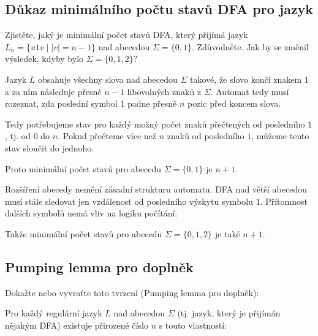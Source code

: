 
\subsection{Důkaz minimálního počtu stavů DFA pro jazyk}
Zjistěte, jaký je minimální počet stavů DFA, který přijímá jazyk $L_n = \{u1v \mid |v|=n-1\}$ nad abecedou
$\Sigma = \{0,1\}$. Zdůvodněte. Jak by se změnil výsledek, kdyby bylo $\Sigma = \{0,1,2\}$?
\newline

Jazyk $L$ obsahuje všechny slova nad abecedou $\Sigma$ takové, že slovo končí znakem $1$ a za ním následuje přesně $n-1$
libovolných znaků z $\Sigma$. Automat tedy musí rozeznat, zda poslední symbol $1$ padne přesně $n$ pozic před koncem
slova.

Tedy potřebujeme stav pro každý možný počet znaků přečtených od posledního $1$, tj. od 0 do $n$. Pokud přečteme více než
$n$ znaků od posledního $1$, můžeme tento stav sloučit do jednoho.

Proto minimální počet stavů pro abecedu $\Sigma = \{0,1\}$ je $n+1$.

Rozšíření abecedy nemění zásadní strukturu automatu. DFA nad větší abecedou musí stále sledovat jen vzdálenost od
posledního výskytu symbolu $1$. Přítomnost dalších symbolů nemá vliv na logiku počítání.

Takže minimální počet stavů pro abecedu $\Sigma = \{0,1,2\}$ je také $n+1$.

\subsection{Pumping lemma pro doplněk} %
Dokažte nebo vyvraťte toto tvrzení (Pumping lemma pro doplněk):

Pro každý regulární jazyk $L$ nad abecedou $\Sigma$ (tj. jazyk, který je přijímán nějakým DFA) existuje přirozené číslo
$n$ s touto vlastností:

